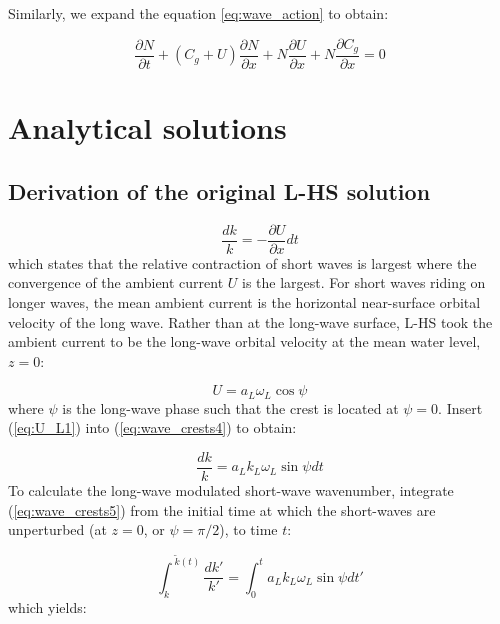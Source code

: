\documentclass[draft]{agujournal2019}
\begin{document}
Similarly, we expand the equation \ref{eq:wave_action} to obtain:

\begin{equation}
\label{eq:wave_action2}
\dfrac{\partial N}{\partial t}
+ \left(C_g + U\right) \dfrac{\partial N}{\partial x}
+ N \dfrac{\partial U}{\partial x}
+ N \dfrac{\partial C_g}{\partial x}
= 0
\end{equation}

\section{Analytical solutions}

\subsection{Derivation of the original L-HS solution}

\begin{equation}
\label{eq:wave_crests4}
\dfrac{d k}{k}
= - \dfrac{\partial U}{\partial x} dt
\end{equation}
which states that the relative contraction of short waves is largest where the
convergence of the ambient current $U$ is the largest.
For short waves riding on longer waves, the mean ambient current is the
horizontal near-surface orbital velocity of the long wave.
Rather than at the long-wave surface, L-HS took the ambient current to be the
long-wave orbital velocity at the mean water level, $z = 0$:

\begin{equation}
\label{eq:U_L1}
U = a_L \omega_L \cos{\psi}
\end{equation}
where $\psi$ is the long-wave phase such that the crest is located
at $\psi = 0$.
Insert (\ref{eq:U_L1}) into (\ref{eq:wave_crests4}) to obtain:

\begin{equation}
\label{eq:wave_crests5}
\dfrac{d k}{k}
= a_L k_L \omega_L \sin{\psi} dt
\end{equation}
To calculate the long-wave modulated short-wave wavenumber, integrate
(\ref{eq:wave_crests5}) from the initial time at which the short-waves
are unperturbed (at $z=0$, or $\psi=\pi/2$), to time $t$:

\begin{equation}
\label{eq:wave_crests6}
\int_k^{\ \widetilde k(t)} \dfrac{d k'}{k'}
= \int_0^t a_L k_L \omega_L \sin{\psi} dt'
\end{equation}
which yields:
\end{document}
